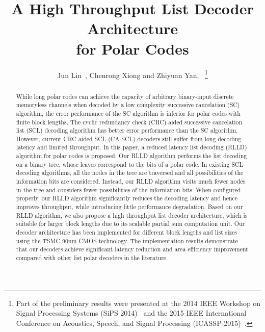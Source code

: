 \documentclass[journal]{IEEEtran}
\begin{document}
\title{A High Throughput List Decoder Architecture\\ for Polar Codes}


\author{Jun Lin~, Chenrong Xiong and Zhiyuan Yan,~
\thanks{Part of the preliminary results were presented at the 2014 IEEE Workshop
  on Signal Processing Systems (SiPS 2014)~\cite{jun_sips} and the 2015 IEEE
International Conference on Acoustics, Speech, and Signal Processing (ICASSP 2015)~\cite{psu_icassp}.}}

\maketitle


\begin{abstract}
While long polar codes can achieve the capacity of arbitrary binary-input discrete memoryless channels when decoded by a low complexity successive cancelation (SC) algorithm, the error performance of the SC algorithm is inferior for polar codes with finite block lengths. The cyclic redundancy check (CRC) aided successive cancelation list (SCL) decoding algorithm has better error performance than the SC algorithm. However, current CRC aided SCL (CA-SCL) decoders still suffer from long decoding latency and limited throughput. In this paper, a reduced latency list decoding (RLLD) algorithm for polar codes is proposed. Our RLLD algorithm performs the list decoding on a binary tree, whose leaves correspond to the bits of a polar code. In existing SCL decoding algorithms, all the nodes in the tree are traversed and all possibilities of the information bits are considered. Instead, our RLLD algorithm visits much fewer nodes in the tree and considers fewer possibilities of the information bits. When configured properly, our RLLD algorithm significantly reduces the decoding latency and hence improves throughput, while introducing little performance degradation. Based on our RLLD algorithm, we also propose a high throughput list decoder architecture, which is suitable for larger block lengths due to its scalable partial sum computation unit. Our decoder architecture has been implemented for different block lengths and list sizes using the TSMC 90nm CMOS technology. The implementation results demonstrate that our decoders achieve significant latency reduction and area efficiency improvement compared with other list polar decoders in the literature.
\end{abstract}
\end{document}
